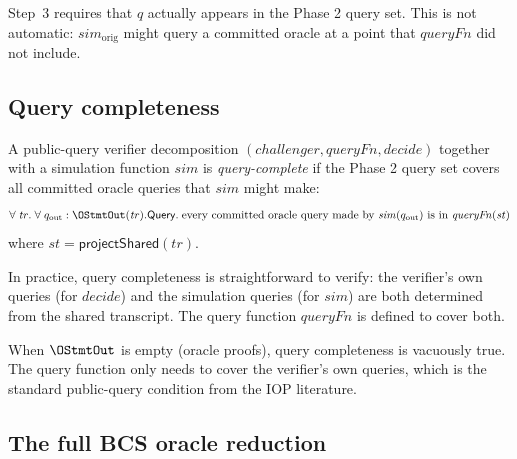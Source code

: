 Step~3 requires that $q$ actually appears in the Phase 2 query set.
This is not automatic: $\mathit{sim}_{\mathrm{orig}}$ might query a
committed oracle at a point that $\mathit{queryFn}$ did not include.

\subsection{Query completeness}

\begin{definition}
  \label{bcs:query-completeness}
  A public-query verifier decomposition
  $(\mathit{challenger}, \mathit{queryFn}, \mathit{decide})$ together with
  a simulation function $\mathit{sim}$ is \emph{query-complete} if the
  Phase 2 query set covers all committed oracle queries that $\mathit{sim}$
  might make:
  \[
    \forall\;\mathit{tr}.\;
    \forall\;q_{\mathrm{out}} : \OStmtOut(\mathit{tr}).\mathsf{Query}.\;
    \text{every committed oracle query made by }
    \mathit{sim}(q_{\mathrm{out}})
    \text{ is in }
    \mathit{queryFn}(\mathit{st})
  \]
  where $\mathit{st} = \mathsf{projectShared}(\mathit{tr})$.
\end{definition}

In practice, query completeness is straightforward to verify: the
verifier's own queries (for $\mathit{decide}$) and the simulation queries
(for $\mathit{sim}$) are both determined from the shared transcript.
The query function $\mathit{queryFn}$ is defined to cover both.

\begin{remark}
  When $\OStmtOut$ is empty (oracle proofs), query completeness is
  vacuously true.
  The query function only needs to cover the verifier's own queries, which
  is the standard public-query condition from the IOP literature.
\end{remark}

\subsection{The full BCS oracle reduction}

